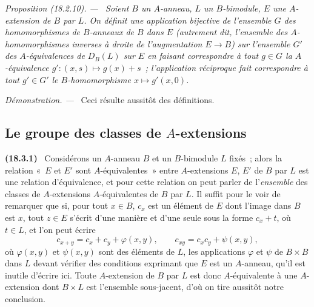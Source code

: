 \documentclass[10pt,oneside]{book}
\makeatletter
\newcommand{\setmanualcurrentlabel}[1]{\def\@currentlabel{#1}}
\newenvironment{env}[1][]{\setmanualcurrentlabel{#1}\par\medskip\noindent\textbf{(#1)}\ }{\par}
\newenvironment{proposition}[1][]{%
  \setmanualcurrentlabel{#1}\par\medskip\noindent\itshape Proposition (#1). ---\ }{\par}
\newenvironment{proof}{%
  \par\medskip\noindent\textit{Démonstration. ---\ }}{\par}
\makeatother
\begin{document}
\begin{proposition}[18.2.10]
\label{0.18.2.10-fr}
Soient $B$ un $A$-anneau, $L$ un $B$-bimodule, $E$ une $A$-extension de $B$
par $L$. On définit une application bijective de l'ensemble $G$ des
homomorphismes de $B$-anneaux de $B$ dans $E$ (autrement dit, l'ensemble des
$A$-homomorphismes inverses à droite de l'augmentation $E\to B$) sur
l'ensemble $G'$ des $A$-équivalences de $D_B(L)$ sur $E$ en faisant
correspondre à tout $g\in G$ la $A$-équivalence
$g':(x,s)\mapsto g(x)+s$~; l'application réciproque fait correspondre à tout
$g'\in G'$ le $B$-homomorphisme $x\mapsto g'(x,0)$.
\end{proposition}

\begin{proof}
Ceci résulte aussitôt des définitions.
\end{proof}

\subsection{Le groupe des classes de $A$-extensions}
\label{subsection:0.18.3-fr}

\begin{env}[18.3.1]
\label{0.18.3.1-fr}
Considérons un $A$-anneau $B$ et un $B$-bimodule $L$ fixés~; alors la relation
«~$E$ et $E'$ sont $A$-équivalentes~» entre $A$-extensions $E$, $E'$ de $B$
par $L$ est une relation d'équivalence, et pour cette relation on peut parler
de l'\emph{ensemble} des classes de $A$-extensions $A$-équivalentes de $B$ par
$L$. Il suffit pour le voir de remarquer que si, pour tout $x\in B$, $c_x$ est
un élément de $E$ dont l'image dans $B$ est $x$, tout $z\in E$ s'écrit d'une
manière et d'une seule sous la forme $c_x+t$, où $t\in L$, et l'on peut écrire
\[
  c_{x+y}=c_x+c_y+\varphi(x,y),\qquad
  c_{xy}=c_xc_y+\psi(x,y),
\]
où $\varphi(x,y)$ et $\psi(x,y)$ sont des éléments de $L$, les applications
$\varphi$ et $\psi$ de $B\times B$ dans $L$ devant vérifier des conditions
exprimant que $E$ est un $A$-anneau, qu'il est inutile d'écrire ici. Toute
$A$-extension de $B$ par $L$ est donc $A$-équivalente à une $A$-extension dont
$B\times L$ est l'ensemble sous-jacent, d'où on tire aussitôt notre conclusion.
\end{env}
\end{document}

